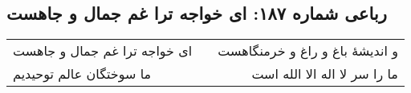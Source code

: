 \begin{center}
\section*{رباعی شماره ۱۸۷: ای خواجه ترا غم جمال و جاهست}
\label{sec:0187}
\begin{longtable}{l p{0.5cm} r}
ای خواجه ترا غم جمال و جاهست
&&
و اندیشهٔ باغ و راغ و خرمنگاهست
\\
ما سوختگان عالم توحیدیم
&&
ما را سر لا اله الا الله است
\\
\end{longtable}
\end{center}
